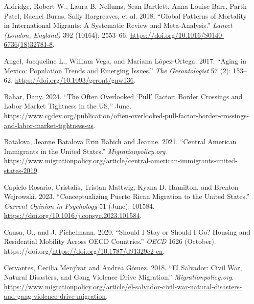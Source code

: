 \documentclass[
]{article}
\newlength{\cslhangindent}
\newenvironment{CSLReferences}[2] %
 {\begin{list}{}{%
  \setlength{\itemindent}{0pt}
  \setlength{\leftmargin}{0pt}
  \setlength{\parsep}{0pt}
  \ifodd #1
   \setlength{\leftmargin}{\cslhangindent}
   \setlength{\itemindent}{-1\cslhangindent}
  \fi
  \setlength{\itemsep}{#2\baselineskip}}}
 {\end{list}}
\begin{document}
\label{refs}
\begin{CSLReferences}{1}{0}
Aldridge, Robert W., Laura B. Nellums, Sean Bartlett, Anna Louise Barr,
Parth Patel, Rachel Burns, Sally Hargreaves, et al. 2018. {``Global
Patterns of Mortality in International Migrants: A Systematic Review and
Meta-Analysis.''} \emph{Lancet (London, England)} 392 (10164): 2553--66.
\url{https://doi.org/10.1016/S0140-6736(18)32781-8}.

Angel, Jacqueline L., William Vega, and Mariana López-Ortega. 2017.
{``Aging in {Mexico}: {Population} {Trends} and {Emerging} {Issues}.''}
\emph{The Gerontologist} 57 (2): 153--62.
\url{https://doi.org/10.1093/geront/gnw136}.

Bahar, Dany. 2024. {``The {Often} {Overlooked} {`{Pull}'} {Factor}:
{Border} {Crossings} and {Labor} {Market} {Tightness} in the {US},''}
June.
\url{https://www.cgdev.org/publication/often-overlooked-pull-factor-border-crossings-and-labor-market-tightness-us}.

Batalova, Jeanne Batalova Erin Babich and Jeanne. 2021. {``Central
{American} {Immigrants} in the {United} {States}.''}
\emph{Migrationpolicy.org}.
\url{https://www.migrationpolicy.org/article/central-american-immigrants-united-states-2019}.

Capielo Rosario, Cristalís, Tristan Mattwig, Kyana D. Hamilton, and
Brenton Wejrowski. 2023. {``Conceptualizing {Puerto} {Rican} Migration
to the {United} {States}.''} \emph{Current Opinion in Psychology} 51
(June): 101584. \url{https://doi.org/10.1016/j.copsyc.2023.101584}.

Causa, O., and J. Pichelmann. 2020. {``Should {I} Stay or Should {I} Go?
{Housing} and Residential Mobility Across {OECD} Countries.''}
\emph{OECD} 1626 (October).
https://doi.org/\url{https://doi.org/10.1787/d91329c2-en}.

Cervantes, Cecilia Menjívar and Andrea Gómez. 2018. {``El {Salvador}:
{Civil} {War}, {Natural} {Disasters}, and {Gang} {Violence} {Drive}
{Migration}.''} \emph{Migrationpolicy.org}.
\url{https://www.migrationpolicy.org/article/el-salvador-civil-war-natural-disasters-and-gang-violence-drive-migration}.


\end{CSLReferences}
\end{document}
